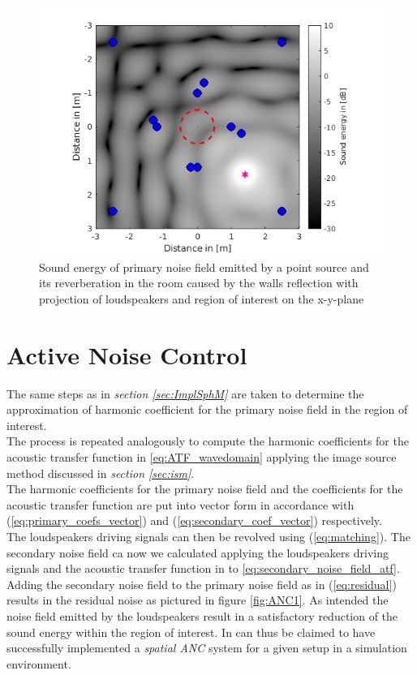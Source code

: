 \begin{figure}
    \centerline{\includegraphics[width=\textwidth]{LaTeX/images/plots/Point_source_reverberation.png}}
    \caption{Sound energy of primary noise field emitted by a point source and its reverberation in the room caused by the walls reflection with projection of loudspeakers and region of interest on the x-y-plane}
    \label{fig:reverberation}
\end{figure}

\section{Active Noise Control}
The same steps as in \textit{section \ref{sec:ImplSphM}} are taken to determine the approximation of harmonic coefficient for the primary noise field in the region of interest.\\
The process is repeated analogously to compute the harmonic coefficients for the acoustic transfer function in \ref{eq:ATF_wavedomain} applying the image source method discussed in \textit{section \ref{sec:ism}}.\\
The harmonic coefficients for the primary noise field and the coefficients for the acoustic transfer function are put into vector form in accordance with (\ref{eq:primary_coefs_vector}) and (\ref{eq:secondary_coef_vector}) respectively.\\
The loudspeakers driving signals can then be revolved using (\ref{eq:matching}).
The secondary noise field ca now we calculated applying the loudspeakers driving signals and the acoustic transfer function in to \ref{eq:secondary_noise_field_atf}. Adding the secondary noise field to the primary noise field as in (\ref{eq:residual}) results in the residual noise as pictured in figure \ref{fig:ANC1}. As intended the noise field emitted by the loudspeakers result in a satisfactory reduction of the sound energy within the region of interest. In can thus be claimed to have successfully implemented a \textit{spatial ANC} system for a given setup in a simulation environment.\\\\

